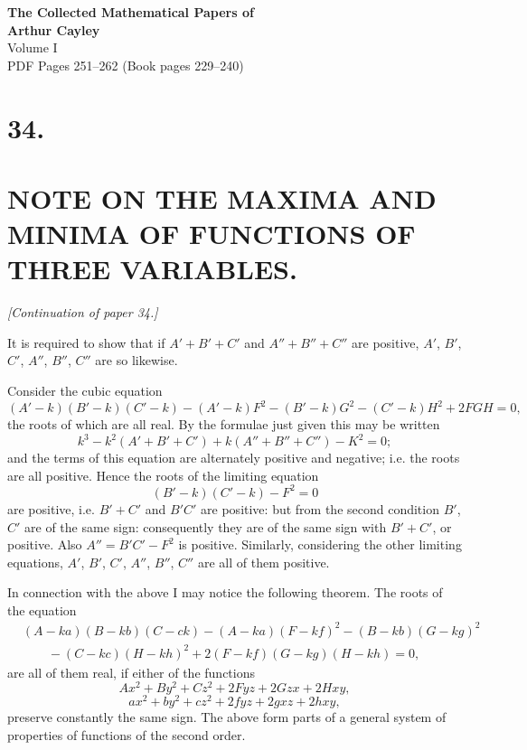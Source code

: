 \documentclass[11pt]{article}
\begin{document}
\begin{center}
{\LARGE\bfseries The Collected Mathematical Papers of}\\[0.5em]
{\LARGE\bfseries Arthur Cayley}\\[1em]
{\Large Volume I}\\[1em]
{\large PDF Pages 251--262 \quad (Book pages 229--240)}\\[2em]
\end{center}

\tableofcontents
\newpage

\section*{34.}
\section*{NOTE ON THE MAXIMA AND MINIMA OF FUNCTIONS OF THREE VARIABLES.}
\setcounter{page}{229}

\noindent\textit{[Continuation of paper 34.]}

\bigskip

It is required to show that if $A' + B' + C'$ and $A'' + B'' + C''$ are positive,
$A'$, $B'$, $C'$, $A''$, $B''$, $C''$ are so likewise.

Consider the cubic equation
\[
(A'-k)(B'-k)(C'-k)-(A'-k)F^2-(B'-k)G^2-(C'-k)H^2+2FGH=0,
\]
the roots of which are all real. By the formulae just given this may be written
\[
k^3-k^2(A'+B'+C')+k(A''+B''+C'')-K^2=0;
\]
and the terms of this equation are alternately positive and negative; i.e. the roots are
all positive. Hence the roots of the limiting equation
\[
(B'-k)(C'-k)-F^2=0
\]
are positive, i.e. $B'+C'$ and $B'C'$ are positive: but from the second condition
$B'$, $C'$ are of the same sign: consequently they are of the same sign with
$B'+C'$, or positive. Also $A''=B'C'-F^2$ is positive. Similarly, considering the
other limiting equations, $A'$, $B'$, $C'$, $A''$, $B''$, $C''$ are all of them positive.

In connection with the above I may notice the following theorem. The roots of the
equation
\[
\begin{aligned}
&(A-ka)(B-kb)(C-ck)-(A-ka)(F-kf)^2-(B-kb)(G-kg)^2\\
&\qquad{}-(C-kc)(H-kh)^2+2(F-kf)(G-kg)(H-kh)=0,
\end{aligned}
\]
are all of them real, if either of the functions
\[
Ax^2+By^2+Cz^2+2Fyz+2Gzx+2Hxy,
\]
\[
ax^2+by^2+cz^2+2fyz+2gxz+2hxy,
\]
preserve constantly the same sign. The above form parts of a general system of
properties of functions of the second order.
\end{document}
